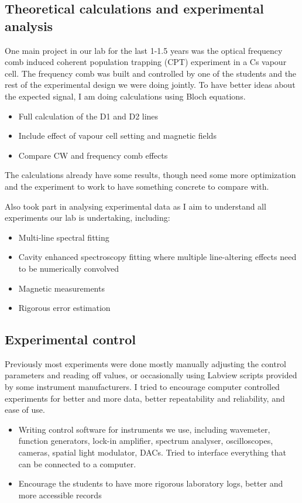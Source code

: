 \documentclass[10pt]{article}
\begin{document}
\subsection*{Theoretical calculations and experimental analysis}

One main project in our lab for the last 1-1.5 years was the optical frequency comb induced coherent population trapping (CPT) experiment in a Cs vapour cell. The frequency comb was built and controlled by one of the students and the rest of the experimental design we were doing jointly. To have better ideas about the expected signal, I am doing calculations using Bloch equations.
\begin{itemize}
\item Full calculation of the D1 and D2 lines
\item Include effect of vapour cell setting and magnetic fields
\item Compare CW and frequency comb effects
\end{itemize}
The calculations already have some results, though need some more optimization and the experiment to work to have something concrete to compare with.

Also took part in analysing experimental data as I aim to understand all experiments our lab is undertaking, including:
\begin{itemize}
\item Multi-line spectral fitting
\item Cavity enhanced spectroscopy fitting where multiple line-altering effects need to be numerically convolved
\item Magnetic measurements
\item Rigorous error estimation
\end{itemize}

\subsection*{Experimental control}

Previously most experiments were done mostly manually adjusting the control parameters and reading off values, or occasionally using Labview scripts provided by some instrument manufacturers. I tried to encourage computer controlled experiments for better and more data, better repeatability and reliability, and ease of use.
\begin{itemize}
\item Writing control software for instruments we use, including wavemeter, function generators, lock-in amplifier, spectrum analyser, oscilloscopes, cameras, spatial light modulator, DACs. Tried to interface everything that can be connected to a computer.
\item Encourage the students to have more rigorous laboratory logs, better and more accessible records
\end{itemize}
\end{document}
